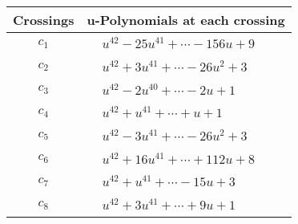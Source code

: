 \documentclass[1p]{elsarticle_modified}
\theoremstyle{definition}
\begin{document}
\begin{tabular}{m{50pt}|m{274pt}}
Crossings & \hspace{64pt}u-Polynomials at each crossing \\
\hline $$\begin{aligned}c_{1}\end{aligned}$$&$\begin{aligned}
&u^{42}-25 u^{41}+\cdots-156 u+9
\end{aligned}$\\
\hline $$\begin{aligned}c_{2}\end{aligned}$$&$\begin{aligned}
&u^{42}+3 u^{41}+\cdots-26 u^2+3
\end{aligned}$\\
\hline $$\begin{aligned}c_{3}\end{aligned}$$&$\begin{aligned}
&u^{42}-2 u^{40}+\cdots-2 u+1
\end{aligned}$\\
\hline $$\begin{aligned}c_{4}\end{aligned}$$&$\begin{aligned}
&u^{42}+u^{41}+\cdots+u+1
\end{aligned}$\\
\hline $$\begin{aligned}c_{5}\end{aligned}$$&$\begin{aligned}
&u^{42}-3 u^{41}+\cdots-26 u^2+3
\end{aligned}$\\
\hline $$\begin{aligned}c_{6}\end{aligned}$$&$\begin{aligned}
&u^{42}+16 u^{41}+\cdots+112 u+8
\end{aligned}$\\
\hline $$\begin{aligned}c_{7}\end{aligned}$$&$\begin{aligned}
&u^{42}+u^{41}+\cdots-15 u+3
\end{aligned}$\\
\hline $$\begin{aligned}c_{8}\end{aligned}$$&$\begin{aligned}
&u^{42}+3 u^{41}+\cdots+9 u+1
\end{aligned}$\\

\end{tabular}
\end{document}
